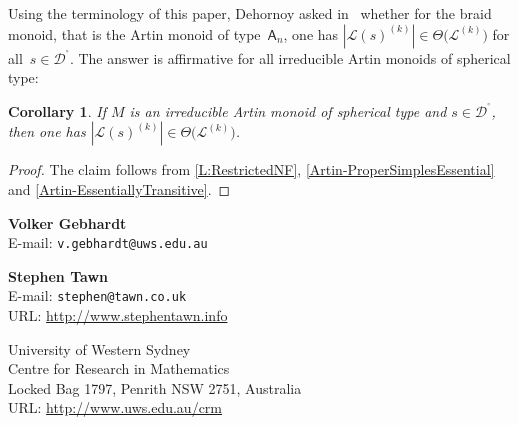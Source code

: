 \documentclass[a4paper,final]{article}
\theoremstyle{plain}
\newtheorem{corollary}[corollary]{Corollary}
\theoremstyle{remark}
\theoremstyle{definition}
\begin{document}
Using the terminology of this paper, Dehornoy asked in~\cite[Question~3.13]{DehornoyJCTA07} whether for the braid monoid, that is the Artin monoid of type~${\mathsf{{A}}}_n$, one has $|{\mathcal{L}}(s)^{(k)}|\in\Theta\big({\mathcal{L}}^{(k)}\big)$ for all~$s\in{{\mathcal{D}}^{\!{}^{\circ}\!}}$.  The answer is affirmative for all irreducible Artin monoids of spherical type:

\begin{corollary}\label{C:Dehornoy}
If $M$ is an irreducible Artin monoid of spherical type and $s\in{{\mathcal{D}}^{\!{}^{\circ}\!}}$, then one has
$|{\mathcal{L}}(s)^{(k)}|\in\Theta\big({\mathcal{L}}^{(k)}\big)$.
\end{corollary}
\begin{proof}
The claim follows from \autoref{L:RestrictedNF}, \autoref{Artin-ProperSimplesEssential} and
\autoref{Artin-EssentiallyTransitive}.
\end{proof}




\bigskip
\noindent
\begin{minipage}[t]{0.45\textwidth}
\noindent\textbf{Volker Gebhardt}\\
\noindent E-mail: \texttt{v.gebhardt@uws.edu.au}
\end{minipage}
\hfill
\begin{minipage}[t]{0.49\textwidth}
\noindent\textbf{Stephen Tawn}\\
\noindent E-mail: \texttt{stephen@tawn.co.uk}\\
\noindent URL: \url{http://www.stephentawn.info}
\end{minipage}
\medskip
\begin{center}
University of Western Sydney\\
Centre for Research in Mathematics\\
Locked Bag 1797, Penrith NSW 2751, Australia\\
\noindent URL: \url{http://www.uws.edu.au/crm}
\end{center}
\end{document}
